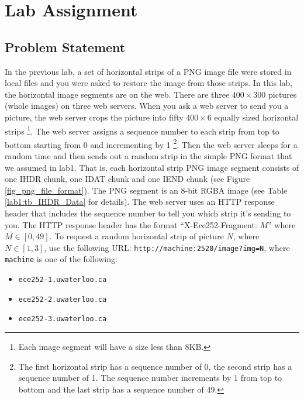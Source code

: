 
\section{Lab Assignment}
\subsection{Problem Statement}
\label{sec:lab2_problem_statement}
In the previous lab, a set of horizontal strips of a PNG image file were stored in local files and you were asked to restore the image from those strips. In this lab, the horizontal image segments are on the web. There are three $400 \times 300$ pictures (whole images) on three web servers. When you ask a web server to send you a picture, the web server crops the picture into fifty
$400 \times 6$ equally sized horizontal strips
\footnote{Each image segment will have a size less than 8KB.}. The web server assigns a sequence number to each strip from top to bottom starting from 0 and incrementing by 1
\footnote{The first horizontal strip has a sequence number of 0, the second strip has a sequence number of 1. The sequence number increments by 1 from top to bottom and the last strip has a sequence number of 49.}. Then the web server sleeps for a random time and then sends out a random strip in the simple PNG format that we assumed in lab1. That is, each horizontal strip PNG image segment consists of one IHDR chunk, one IDAT chunk and one IEND chunk (see Figure \ref{fig_png_file_format}). The PNG segment is an 8-bit RGBA image (see Table \ref{lab1:tb_IHDR_Data} for details). The web server uses an HTTP response header that includes the sequence number to tell you which strip it's sending to you. The HTTP response header has the format ``X-Ece252-Fragment: $M$'' where $M \in [0, 49]$. To request a random horizontal strip of picture $N$, where $N\in[1,3]$, use the following URL:
\verb+http://machine:2520/image?img=N+, where \texttt{machine} is one of the following:
\begin{itemize}
\item \texttt{ece252-1.uwaterloo.ca}
\item \texttt{ece252-2.uwaterloo.ca}
\item \texttt{ece252-3.uwaterloo.ca}
\end{itemize}

